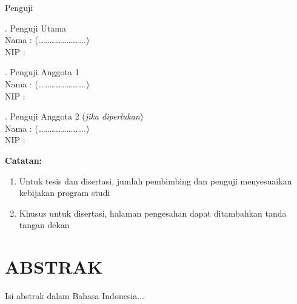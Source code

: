\documentclass[12pt, a4paper, onecolumn, oneside]{report}
\begin{document}
\noindent Penguji \\

\vspace{0.5cm} %

. Penguji Utama \\
Nama \quad: \underline{\hspace{5cm}} \hfill (…………………….) \\
NIP \quad\quad: \underline{\hspace{5cm}} \\

\vspace{0.5cm} %

. Penguji Anggota 1 \\
Nama \quad: \underline{\hspace{5cm}} \hfill (…………………….) \\
NIP \quad\quad: \underline{\hspace{5cm}} \\

\vspace{0.5cm} %

. Penguji Anggota 2 (\textit{jika diperlukan}) \\
Nama \quad: \underline{\hspace{5cm}} \hfill (…………………….) \\
NIP \quad\quad: \underline{\hspace{5cm}} \\

\vspace{1.5cm} %

\noindent \textbf{Catatan:} \\
\begin{enumerate}[label=\alph*)] %
    \item Untuk tesis dan disertasi, jumlah pembimbing dan penguji menyesuaikan kebijakan program studi  \\
    \item Khusus untuk disertasi, halaman pengesahan dapat ditambahkan tanda tangan dekan \\
\end{enumerate}

\clearpage

\cleardoublepage
\chapter*{ABSTRAK}
Isi abstrak dalam Bahasa Indonesia...
\end{document}
